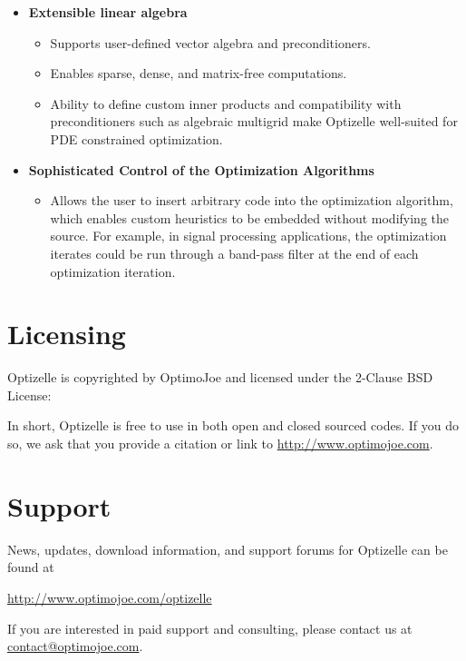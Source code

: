 \documentclass{report}
\begin{document}
\begin{itemize}
\begin{itemize}
        \end{itemize}
    \item {\bf Extensible linear algebra}
        \begin{itemize}
            \item Supports user-defined vector algebra and preconditioners.
            \item Enables sparse, dense, and matrix-free computations.
            \item Ability to define custom inner products and compatibility with preconditioners such as algebraic multigrid make Optizelle well-suited for PDE constrained optimization.
        \end{itemize}
    \item {\bf Sophisticated Control of the Optimization Algorithms}
        \begin{itemize}
            \item Allows the user to insert arbitrary code into the optimization algorithm, which enables custom heuristics to be embedded without modifying the source.  For example, in signal processing applications, the optimization iterates could be run through a band-pass filter at the end of each optimization iteration.
        \end{itemize}
\end{itemize}

\section{Licensing}

        Optizelle is copyrighted by OptimoJoe and licensed under the 2-Clause BSD License:

In short, Optizelle is free to use in both open and closed sourced codes.  If you do so, we ask that you provide a citation or link to \url{http://www.optimojoe.com}.

\section{Support}
        
        News, updates, download information, and support forums for Optizelle can be found at
\begin{center}
    \mbox{\url{http://www.optimojoe.com/optizelle}}
\end{center}
If you are interested in paid support and consulting, please contact us at \mbox{\href{mailto:contact@optimojoe.com}{contact@optimojoe.com}}.
\end{document}
